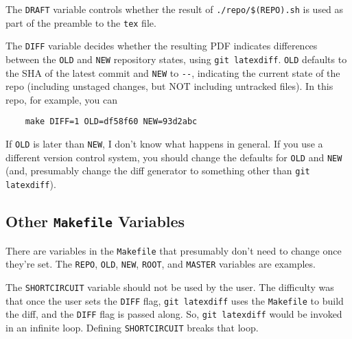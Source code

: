 The \texttt{DRAFT} variable controls whether the result of \texttt{./repo/\$(REPO).sh} is used as part of the preamble to the \texttt{tex} file.

The \texttt{DIFF} variable decides whether the resulting PDF indicates differences between the \texttt{OLD} and \texttt{NEW} repository states, using \texttt{git latexdiff}\cite{git-latexdiff}.  \texttt{OLD} defaults to the SHA of the latest commit and \texttt{NEW} to \texttt{-{}-}, indicating the current state of the repo (including unstaged changes, but NOT including untracked files).  In this repo, for example, you can
\begin{verbatim}
	make DIFF=1 OLD=df58f60 NEW=93d2abc
\end{verbatim}
If \texttt{OLD} is later than \texttt{NEW}, I don't know what happens in general.
If you use a different version control system, you should change the defaults for \texttt{OLD} and \texttt{NEW} (and, presumably change the diff generator to something other than \texttt{git latexdiff}).

\subsection{Other \texttt{Makefile} Variables}

There are variables in the \texttt{Makefile} that presumably don't need to change once they're set.
The \texttt{REPO}, \texttt{OLD}, \texttt{NEW}, \texttt{ROOT}, and \texttt{MASTER} variables are examples.

The \texttt{SHORTCIRCUIT} variable should not be used by the user.
The difficulty was that once the user sets the \texttt{DIFF} flag, \texttt{git latexdiff} uses the \texttt{Makefile} to build the diff, and the \texttt{DIFF} flag is passed along.  So, \texttt{git latexdiff} would be invoked in an infinite loop.
Defining \texttt{SHORTCIRCUIT} breaks that loop.